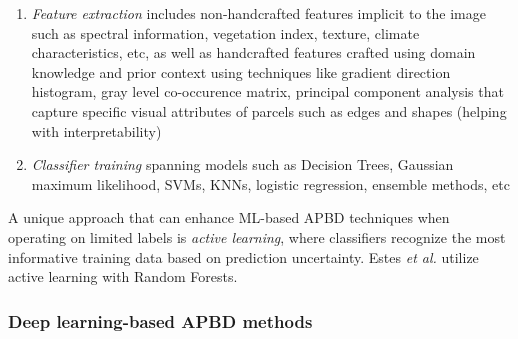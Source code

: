 \documentclass{report}
\begin{document}
\begin{enumerate}
  \item \emph{Feature extraction} includes non-handcrafted features implicit to the image such as spectral
    information, vegetation index, texture, climate characteristics, etc, as well as handcrafted features
    crafted using domain knowledge and prior context using techniques like gradient direction histogram,
    gray level co-occurence matrix, principal component analysis that capture specific visual attributes of
    parcels such as edges and shapes (helping with interpretability)
  \item \emph{Classifier training} spanning models such as Decision Trees, Gaussian maximum likelihood, SVMs,
    KNNs, logistic regression, ensemble methods, etc
\end{enumerate}

A unique approach that can enhance ML-based APBD techniques when operating on limited labels
is \emph{active learning}, where classifiers 
recognize the most informative training data based on prediction uncertainty. Estes \emph{et al.} \cite{estes2022} 
utilize active
learning with Random Forests.

\subsubsection{Deep learning-based APBD methods}
\end{document}
